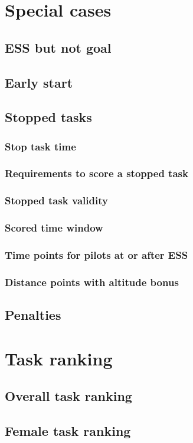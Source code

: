 \documentclass{article}
\begin{document}
\newpage
\section{Special cases}
\subsection{ESS but not goal}
\subsection{Early start}
\subsection{Stopped tasks}
\subsubsection{Stop task time}
\subsubsection{Requirements to score a stopped task}
\subsubsection{Stopped task validity}
\subsubsection{Scored time window}
\subsubsection{Time points for pilots at or after ESS}
\subsubsection{Distance points with altitude bonus}
\subsection{Penalties}

\newpage
\section{Task ranking}
\subsection{Overall task ranking}
\subsection{Female task ranking}
\end{document}
